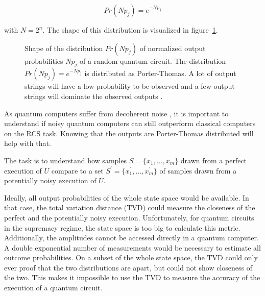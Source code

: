 \begin{equation}
  Pr(Np_j) = e^{-Np_j}
\end{equation}

with $N=2^n$. The shape of this distribution is visualized in figure~\ref{fig:porterthomas}.

\begin{figure}[H]
  \centering
  \caption[Output Distribution of Random Quantum Circuits]{Shape of the distribution $Pr(Np_j)$ of normalized output probabilities $Np_j$ of a
    random quantum circuit. The distribution $Pr(Np_j)=e^{-Np_j}$ is distributed as
    Porter-Thomas. A lot of output strings will have a low probability to be
    observed and a few output strings will dominate the observed outputs \cite{Boixo2018supremacy}.}
  \label{fig:porterthomas}
\end{figure}

As quantum computers suffer from decoherent noise \cite{Zeh:1970zz}, it is
important to understand if noisy quantum computers can still
outperform classical computers on the RCS task. Knowing that the outputs are
Porter-Thomas distributed will help with that.

The task is to understand how samples $S=\{x_1,\dots,x_m\}$ drawn from a perfect execution of
$U$ compare to a set $S^{\prime}=\{x_1^{\prime},\dots,x_m^{\prime}\}$ of samples drawn from a potentially noisy
execution of $U$.

Ideally, all output probabilities of the whole state space would be available. In that case, 
the total variation distance (TVD) could measure the closeness of the perfect and the potentially noisy 
execution. Unfortunately, for quantum circuits in the supremacy regime, the state space is too big 
to calculate this metric. Additionally, the amplitudes cannot be accessed directly in a quantum computer. 
A double exponential number of measurements would be necessary to estimate all outcome probabilities.
On a subset of the whole state space, the TVD could only ever proof that the two distributions are apart, but 
could not show closeness of the two. 
This makes it impossible to use the TVD to measure the accuracy of the execution of a quantum circuit.

